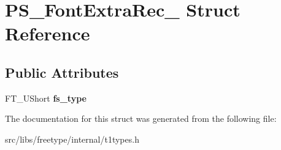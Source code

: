 \hypertarget{struct_p_s___font_extra_rec__}{
\section{PS\_\-FontExtraRec\_\- Struct Reference}
\label{struct_p_s___font_extra_rec__}
}
\subsection*{Public Attributes}
\begin{DoxyCompactItemize}
\item 
\hypertarget{struct_p_s___font_extra_rec___a048e1e57ee974c3e05e9a88476e6b8a9}{
FT\_\-UShort {\bfseries fs\_\-type}}
\label{struct_p_s___font_extra_rec___a048e1e57ee974c3e05e9a88476e6b8a9}

\end{DoxyCompactItemize}


The documentation for this struct was generated from the following file:\begin{DoxyCompactItemize}
\item 
src/libs/freetype/internal/t1types.h\end{DoxyCompactItemize}
